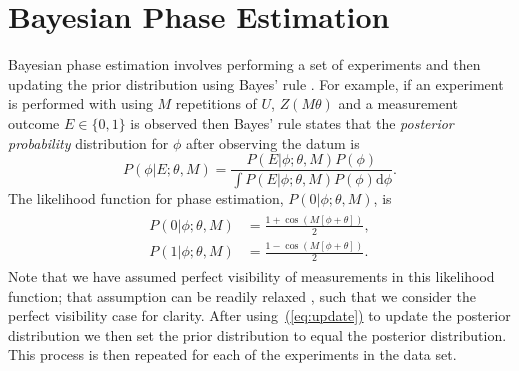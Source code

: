 \documentclass[aps,pra,amsmath,twocolumn,amssymb,superscriptaddress]{revtex4-1}
\newcommand{\eq}[1]{\hyperref[eq:#1]{(\ref*{eq:#1})}}
\begin{document}

\section{Bayesian Phase Estimation}
\label{sec:bayesian-phase-est}

Bayesian phase estimation involves performing a 
set of experiments and then updating the prior distribution using Bayes' rule
\cite{berry_optimal_2000,berry_optimal_2001,SHF14}.
For example, if an experiment is performed with using $M$ repetitions of $U$,
$Z(M \theta)$ and a measurement outcome $E\in \{0,1\}$ is observed then Bayes'
rule states that the \emph{posterior probability} distribution for $\phi$
after observing the datum is
\begin{equation}
P(\phi|E;\theta,M) = \frac{P(E|\phi;\theta,M)P(\phi)}{\int P(E|\phi;\theta,M)P(\phi)\mathrm{d}{\phi}}.\label{eq:update}
\end{equation}
The likelihood
function for phase estimation, $P(0|\phi;\theta,M)$,  is
\begin{gather}
    \label{eq:likenodecohere}
    \begin{aligned}
        P(0|\phi;\theta,M) & = \frac{1+\cos(M[\phi +\theta])}{2},\\
        P(1|\phi;\theta,M) & = \frac{1-\cos(M[\phi +\theta])}{2}.
    \end{aligned}
\end{gather}
Note that we have assumed perfect visibility of measurements in this likelihood function;
that assumption can be readily relaxed \cite{ferrie_how_2013,cappellaro_spin_2012}, such that
we consider the perfect visibility case for clarity.
After using~\eq{update} to update the posterior distribution we then set the prior distribution to equal the posterior distribution.  This process is then repeated for each of the experiments in the data set.
\end{document}
